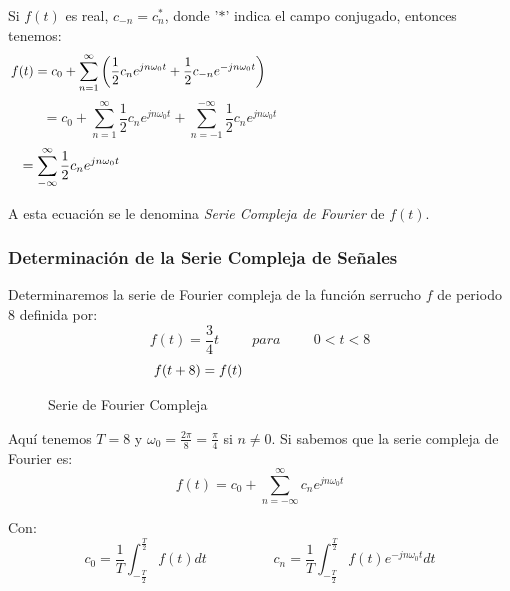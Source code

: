 \documentclass[a4paper]{article}
\begin{document}
{} Si $f(t)$ es real, $c_{-n}=c_{n}^{*}$, donde '$*$' indica el campo
conjugado, entonces tenemos:  
\[
f(t)=c_{0}+\sum_{n=1}^{\infty}\left(\frac{1}{2}c_{n}e^{jn\omega_{0}t}+ \frac{%
1}{2}c_{-n}e^{-jn\omega_{0}t}\right) \hspace{6.5cm}
\]
\[
=c_{0}+\sum_{n=1}^{\infty}\frac{1}{2}c_{n}e^{jn\omega_{0}t}+\sum_{n=-1}^{-%
\infty}\frac{1}{2}c_{n}e^{jn\omega_{0}t} \hspace{6cm}
\]
\[
=\sum_{-\infty}^{\infty}\frac{1}{2}c_{n}e^{jn\omega_{0}t} \hspace{9.5cm}
\]

{} A esta ecuaci\'on se le denomina \textit{Serie Compleja de Fourier} de $%
f(t)$.


\subsubsection{Determinaci\'on de la Serie Compleja de Se\~{n}ales}

{} Determinaremos la serie de Fourier compleja de la funci\'on serrucho $f$
de periodo 8 definida por:  
\[
f(t)=\frac{3}{4}t \hspace{1cm} para \hspace{1cm} 0<t<8
\]
\[
f(t+8)=f(t) \hspace{3.2cm}
\]

\begin{figure}[h]
\caption{Serie de Fourier Compleja}
\label{fig:seriecompleja}
\end{figure}

{} Aqu\'i tenemos $T=8$ y $\omega_{0}=\frac{2\pi}{8}=\frac{\pi}{4}$ si $%
n\neq 0$. Si sabemos que la serie compleja de Fourier es:  
\[
f(t)=c_{0}+\sum_{n=-\infty}^{\infty}c_{n}e^{jn\omega_{0}t}
\]

{} Con:  
\[
c_{0}=\frac{1}{T}\int_{-\frac{T}{2}}^{\frac{T}{2}}f(t)dt \hspace{2cm} c_{n}=%
\frac{1}{T}\int_{-\frac{T}{2}}^{\frac{T}{2}}f(t)e^{-jn\omega_{0}t}dt
\]
\end{document}
